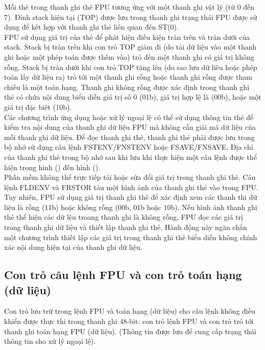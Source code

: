 	Mỗi thẻ trong thanh ghi thẻ FPU tương ứng với một thanh ghi vật lý (từ 0 đến 7). Đỉnh stack hiện tại (TOP) được lưu trong thanh ghi trạng thái FPU được sử dụng để kết hợp với thanh ghi thẻ liên quan đến ST(0). \\
	
	FPU sử dụng giá trị của thẻ để phát hiện điều kiện tràn trên và tràn dưới của stack. Stack bị tràn trên khi con trỏ TOP giảm đi (do tải dữ liệu vào một thanh ghi hoặc một phép toán được thêm vào) trỏ đến một thanh ghi có giá trị không rỗng. Stack bị tràn dưới khi con trỏ TOP tăng lên (do sao lưu dữ liêu hoặc phép toán lấy dữ liệu ra) trỏ tới một thanh ghi rỗng hoặc thanh ghi rỗng được tham chiếu là một toán hạng. Thanh ghi không rỗng được xác định trong thanh ghi thẻ có chứa nội dung biểu diễn giá trị số 0 (01b), giá trị hợp lệ là (00b), hoặc một giá trị đặc biêt (10b).\\
	
	Các chương trình ứng dụng hoặc xử lý ngoại lệ có thể sử dụng thông tin thẻ để kiểm tra nội dung của thanh ghi dữ liệu FPU mà không cần giải mã dữ liệu của mỗi thanh ghi dữ liệu. Để đọc thanh ghi thẻ, thanh ghi thẻ phải được lưu trong bộ nhớ sử dụng câu lệnh FSTENV/FNSTENV hoặc FSAVE/FNSAVE.  Địa chỉ của thanh ghi thẻ trong bộ nhớ sau khi lưu khi thực hiện một câu lệnh được thể hiện trong hình () đến hình (). \\
	
	Phần mềm không thể trực tiếp tải hoặc sửa đổi giá trị trong thanh ghi thẻ. Câu lệnh FLDENV và FRSTOR tảu một hình ảnh của thanh ghi thẻ vào trong FPU. Tuy nhiên, FPU sử dụng giá trị thanh ghi thẻ để xác định xem các thanh thi dữ liệu là rỗng (11b) hoặc không rỗng (00b, 01b hoặc 10b). Nếu hình ảnh thanh ghi thẻ thể hiện các dữ lệu troang thanh ghi là không rỗng, FPU đọc các giá trị trong thanh ghi dữ liệu và thiết lập thanh ghi thẻ. Hành động này ngăn chẳn một chương trình thiết lập các giá trị trong thanh ghi thẻ biểu diễn không chính xác nội dung hiện tại của thanh ghi dữ liệu.
	
		\subsection*{Con trỏ câu lệnh FPU và con trỏ toán hạng (dữ liệu)}
	Con trỏ lưu trữ trong lệnh FPU và toán hạng (dữ liệu) cho câu lệnh không điều khiển được thực thi trong thanh ghi 48-bit: con trỏ lệnh FPU và con trỏ trỏ tới thanh ghi toán hạng FPU (dữ liệu). (Thông tin được lưu để cung cấp trạng thái thông tin cho xử lý ngoại lệ). \\
	
